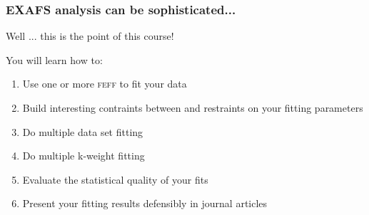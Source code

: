 \documentclass[10pt, xcolor=x11names, compress]{beamer}
\begin{document}
\begin{frame}
\end{frame}

\begin{frame}
  \frametitle{EXAFS analysis can be sophisticated...}
  \begin{block}{}
    \begin{center}
      Well ... this is the point of this course!
    \end{center}
  \end{block}

  You will learn how to:
  \begin{enumerate}
  \item Use one or more \textsc{feff} to fit your data
  \item Build interesting contraints between and restraints on your
    fitting parameters
  \item Do multiple data set fitting
  \item Do multiple k-weight fitting
  \item Evaluate the statistical quality of your fits
  \item Present your fitting results defensibly in journal articles
  \end{enumerate}
\end{frame}
\end{document}
